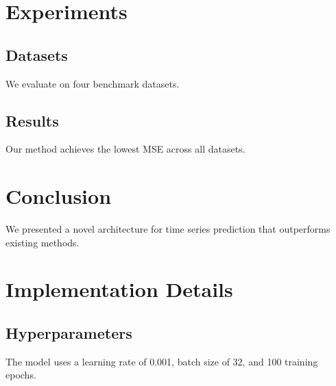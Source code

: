\documentclass[12pt, a4paper, oneside]{memoir}
\begin{document}
\chapter{Experiments}
\section{Datasets}
We evaluate on four benchmark datasets.

\section{Results}
Our method achieves the lowest MSE across all datasets.

\chapter{Conclusion}
We presented a novel architecture for time series
prediction that outperforms existing methods.

\backmatter



\appendix
\chapter{Implementation Details}
\section{Hyperparameters}
The model uses a learning rate of 0.001, batch size
of 32, and 100 training epochs.
\end{document}
